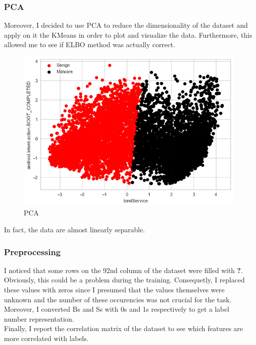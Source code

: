 \documentclass[unicode,11pt,a4paper,oneside,numbers=endperiod,openany]{scrartcl}
\begin{document}
\subsubsection*{PCA}
Moreover, I decided to use PCA to reduce the dimensionality of the dataset and apply on it the KMeans in order to plot and visualize the data. Furthermore, this allowed me to see if ELBO method was actually correct. 
\begin{figure}[H]
  \includegraphics[scale=0.6]{images/PCA.png}
  \centering
  \caption{PCA}
  \label{fig:PCA}
\end{figure}
In fact, the data are almost linearly separable.
\subsubsection*{Preprocessing}
I noticed that some rows on the 92nd column
 of the dataset were filled with \textbf{?}. 
 Obviously, this could be a problem during the 
 training. Consequetly, I replaced these values
  with zeros since I presumed that the values 
  themselves were unknown and the number of these
 occurencies was not crucial for the task. \\
 Moreover, I converted Bs and Ss with 0s and 1s respectively to get a label number representation. \\
 Finally, I report the correlation matrix of the dataset to see which features are more correlated with labels. 
\end{document}
